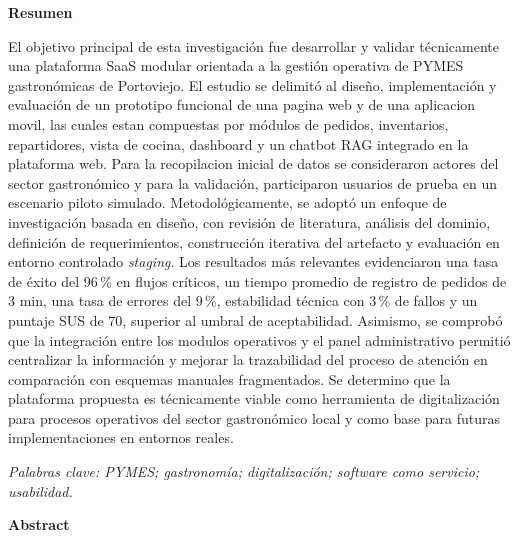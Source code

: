 \clearpage
    \thispagestyle{plain}
    \begin{center}
        \vspace*{1.2cm}
        \textbf{Resumen}
    \end{center}

    \vspace{0.3cm}
\raggedright
    El objetivo principal de esta investigación fue desarrollar y validar técnicamente una plataforma SaaS modular orientada a la gestión operativa de PYMES gastronómicas de Portoviejo. El estudio se delimitó al diseño, implementación y evaluación de un prototipo funcional de una pagina web y de una aplicacion movil, las cuales estan compuestas por módulos de pedidos, inventarios, repartidores, vista de cocina, dashboard y un chatbot RAG integrado en la plataforma web. Para la recopilacion inicial de datos se consideraron actores del sector gastronómico y para la validación, participaron usuarios de prueba en un escenario piloto simulado. Metodológicamente, se adoptó un enfoque de investigación basada en diseño, con revisión de literatura, análisis del dominio, definición de requerimientos, construcción iterativa del artefacto y evaluación en entorno controlado \textit{staging}. Los resultados más relevantes evidenciaron una tasa de éxito del 96\,\% en flujos críticos, un tiempo promedio de registro de pedidos de 3 min, una tasa de errores del 9\,\%, estabilidad técnica con 3\,\% de fallos y un puntaje SUS de 70, superior al umbral de aceptabilidad. Asimismo, se comprobó que la integración entre los modulos operativos y el panel administrativo permitió centralizar la información y mejorar la trazabilidad del proceso de atención en comparación con esquemas manuales fragmentados. Se determino que la plataforma propuesta es técnicamente viable como herramienta de digitalización para procesos operativos del sector gastronómico local y como base para futuras implementaciones en entornos reales.

    \vspace{0.3cm}
    \textit{Palabras clave: PYMES; gastronomía; digitalización; software como servicio; usabilidad.}

\clearpage
\thispagestyle{plain}
    \begin{center}
        \textbf{Abstract}
    \end{center}

